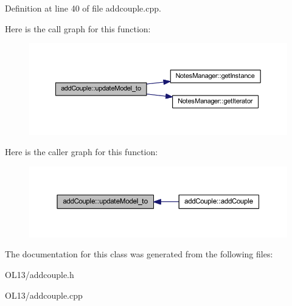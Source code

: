 Definition at line 40 of file addcouple.\+cpp.

Here is the call graph for this function\+:\nopagebreak
\begin{figure}[H]
\begin{center}
\leavevmode
\includegraphics[width=350pt]{classadd_couple_aa0334cda3e89d32093da234cbd1e8c07_cgraph}
\end{center}
\end{figure}
Here is the caller graph for this function\+:\nopagebreak
\begin{figure}[H]
\begin{center}
\leavevmode
\includegraphics[width=350pt]{classadd_couple_aa0334cda3e89d32093da234cbd1e8c07_icgraph}
\end{center}
\end{figure}


The documentation for this class was generated from the following files\+:\begin{DoxyCompactItemize}
\item 
O\+L13/addcouple.\+h\item 
O\+L13/addcouple.\+cpp\end{DoxyCompactItemize}
